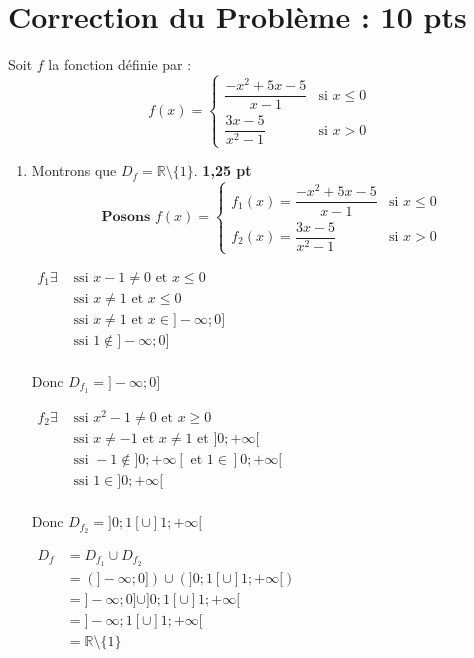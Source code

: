 \documentclass[12pt,a4paper]{article}
\begin{document}
\section*{Correction du Problème : 10 pts}

Soit \( f \) la fonction définie par :
\[
f(x) = 
\begin{cases}
\dfrac{-x^2 + 5x - 5}{x - 1} & \text{si } x \leq 0 \\
\dfrac{3x - 5}{x^2 - 1} & \text{si } x > 0
\end{cases}
\]

\begin{enumerate}
    \item Montrons que \( D_f = \mathbb{R} \setminus \{1\} \). \hfill \textbf{1{,}25 pt}
    \[\textbf{Posons }
f(x) = 
\begin{cases}
f_{1}(x)=\dfrac{-x^2 + 5x - 5}{x - 1} & \text{si } x \leq 0 \\
f_{2}(x)=\dfrac{3x - 5}{x^2 - 1} & \text{si } x > 0
\end{cases}
\]

\( 
\begin{aligned}
f_{1} \exists &\text{ ssi }  x - 1 \neq 0 \text{ et } x \leq 0\\
							&\text{ ssi }  x \neq 1 \text{ et } x \leq 0\\
							&\text{ ssi }  x \neq 1 \text{ et } x \in ]-\infty ; 0]\\
							&\text{ ssi }  1  \notin ]-\infty ; 0]\\
\end{aligned}
\)

Donc \( D_{f_{1}} = ]-\infty ; 0] \)

\( 
\begin{aligned}
f_{2} \exists &\text{ ssi }  x^{2} - 1 \neq 0 \text{ et } x \geq 0\\
							&\text{ ssi }  x \neq -1 \text{ et } x \neq 1 \text{ et } ]0 ;+\infty[\\
							&\text{ ssi }  -1  \notin ]0 ;+\infty[ \text{ et } 1  \in ]0 ;+\infty[\\
							&\text{ ssi }  1  \in ]0 ;+\infty[\\
\end{aligned}
\)

Donc \( D_{f_{2}} = ]0 ; 1[ \cup ]1;+\infty[ \)

\(
\begin{aligned}
D_f &= D_{f_1} \cup D_{f_2} \\
    &= (]-\infty ; 0]) \cup (]0 ; 1[ \cup ]1 ; +\infty[) \\
    &= ]-\infty ; 0] \cup ]0 ; 1[ \cup ]1 ; +\infty[ \\
    &= ]-\infty ; 1[ \cup ]1 ; +\infty[ \\
    &=\mathbb{R}\setminus\{1\}
\end{aligned}
\)


\end{enumerate}
\end{document}
